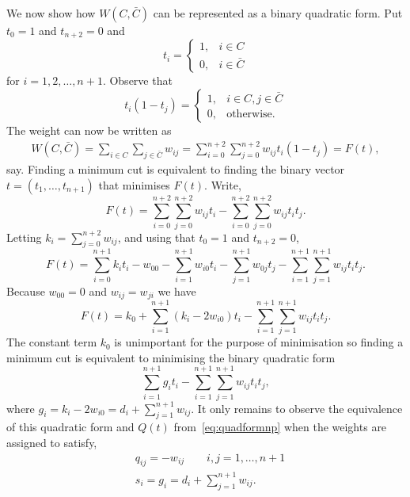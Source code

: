 \documentclass[final,leqno]{siamltex}
\begin{document}

We now show how $W(C,\bar{C})$ can be represented as a binary quadratic form.  Put $t_0 = 1$ and $t_{n+2} = 0$ and
\[
t_i = \begin{cases}
1, & i \in C \\
0, & i \in \bar{C}
\end{cases}
\]
for $i = 1,2,\dots,n+1$.  Observe that
\[
t_i(1 - t_j) = \begin{cases}
1, & i \in C, j \in \bar{C} \\
0, & \text{otherwise}.
\end{cases}
\]
The weight can now be written as
\begin{align*}
W(C,\bar{C}) = \sum_{i \in C} \sum_{j \in \bar{C}} w_{ij} = \sum_{i =0}^{n+2} \sum_{j =0}^{n+2} w_{ij} t_i (1 - t_j) = F(t),
\end{align*}
say.  Finding a minimum cut is equivalent to finding the binary vector $t = (t_1, \dots, t_{n+1})$ that minimises $F(t)$.  Write,
\[
F(t) =  \sum_{i=0}^{n+2} \sum_{j =0}^{n+2} w_{ij}t_i - \sum_{i=0}^{n+2} \sum_{j =0}^{n+2} w_{ij} t_it_j.
\]
Letting $k_i = \sum_{j =0}^{n+2} w_{ij}$, and using that $t_0 = 1$ and $t_{n+2} = 0$,
\[
F(t) = \sum_{i=0}^{n+1}k_it_i  - w_{00} - \sum_{i=1}^{n+1} w_{i0} t_i - \sum_{j=1}^{n+1} w_{0j} t_j - \sum_{i=1}^{n+1} \sum_{j =1}^{n+1} w_{ij} t_it_j.
\]
Because $w_{00} = 0$ and $w_{ij} = w_{ji}$ we have
\[
F(t) = k_0 + \sum_{i=1}^{n+1}( k_i  - 2 w_{i0}) t_i  - \sum_{i=1}^{n+1} \sum_{j =1}^{n+1} w_{ij} t_it_j.
\]
The constant term $k_0$ is unimportant for the purpose of minimisation so finding a minimum cut is equivalent to minimising the binary quadratic form
\[
\sum_{i=1}^{n+1}g_i t_i  - \sum_{i=1}^{n+1} \sum_{j =1}^{n+1} w_{ij} t_it_j,
\]
where $g_i = k_i  - 2 w_{i0} = d_i + \sum_{j=1}^{n+1} w_{ij}$.  It only remains to observe the equivalence of this quadratic form and $Q(t)$ from~\eqref{eq:quadformnp} when the weights are assigned to satisfy,
\begin{align*}
&q_{ij} = - w_{ij} \qquad i,j = 1,\dots,n+1 \\
&s_i = g_i = d_i + \sum_{j=1}^{n+1} w_{ij}.
\end{align*}
\end{document}
